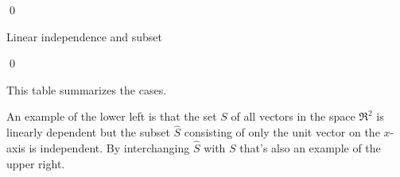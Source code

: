 \begin{frame}

\pause
\pf
{}
\qed
\end{frame}




\begin{frame}{Linear independence and subset}
\lm[le:SubsetPreserveLI]

\pf
{}
\qed

\pause
\medskip
This table summarizes the cases.
\medskip

An example of the lower left is that the set $S$ of all vectors in the
space $\Re^2$ is linearly dependent but the subset $\hat{S}$ consisting of only the 
unit vector on the $x$-axis is independent.
By interchanging $\hat{S}$ with $S$ that's also an example of the upper right.
\end{frame}



% 

